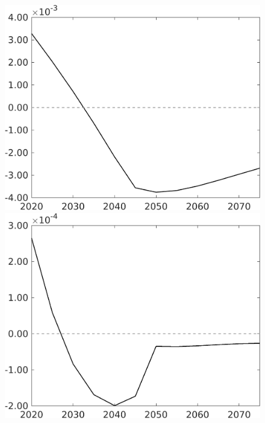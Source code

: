 \begin{figure}[h!!!]
\begin{minipage}[]{0.32\textwidth}
	\end{minipage}
	\begin{minipage}[]{0.32\textwidth}
		\includegraphics[width=1\textwidth]{../../codding_model/own_basedOnFried/optimalPol_010922_revision/figures/all_13Sept22_Tplus30/gAn_OPT_COMPtaulPer_regime4_spillover0_knspil0_noskill0_sep0_xgrowth0_PV1_etaa0.79.png}
	\end{minipage}
	\begin{minipage}[]{0.32\textwidth}
		\includegraphics[width=1\textwidth]{../../codding_model/own_basedOnFried/optimalPol_010922_revision/figures/all_13Sept22_Tplus30/SWF_OPT_COMPtaulPer_regime4_spillover0_knspil0_noskill0_sep0_xgrowth0_PV1_etaa0.79.png}

\end{minipage}
\end{figure}
